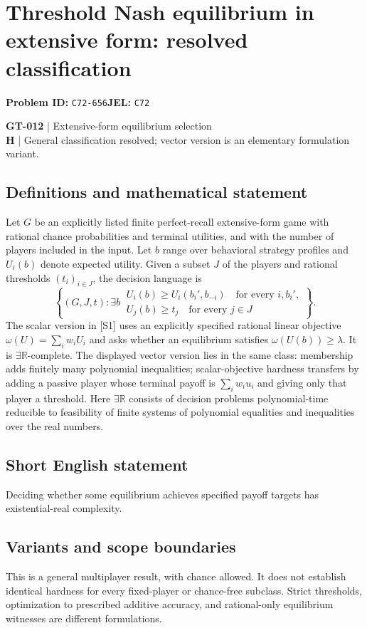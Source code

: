 \documentclass[11pt,a4paper]{article}
\begin{document}
\section*{Threshold Nash equilibrium in extensive form: resolved classification}
\textbf{Problem ID:} \texttt{C72-656}\quad \textbf{JEL:} \texttt{C72}\par
\label{problem:OP-0142}
\label{game:GT-012}
{\sffamily\small\color{muted}
\textbf{GT-012} | Extensive-form equilibrium selection\\
\textbf{H} | General classification resolved; vector version is an elementary formulation variant.
\par}
\subsection*{Definitions and mathematical statement}
Let $G$ be an explicitly listed finite perfect-recall extensive-form game with rational chance probabilities and terminal utilities, and with the number of players included in the input. Let $b$ range over behavioral strategy profiles and $U_i(b)$ denote expected utility. Given a subset $J$ of the players and rational thresholds $(t_i)_{i\in J}$, the decision language is
\[
 \left\{(G,J,t):\exists b\ 
 \begin{array}{l}
 U_i(b)\geq U_i(b_i',b_{-i})\quad\text{for every }i,b_i',\\
 U_j(b)\geq t_j\quad\text{for every }j\in J
 \end{array}\right\}.
\]
The scalar version in [S1] uses an explicitly specified rational linear objective $\omega(U)=\sum_iw_iU_i$ and asks whether an equilibrium satisfies $\omega(U(b))\geq\lambda$. It is $\exists\mathbb R$-complete. The displayed vector version lies in the same class: membership adds finitely many polynomial inequalities; scalar-objective hardness transfers by adding a passive player whose terminal payoff is $\sum_iw_iu_i$ and giving only that player a threshold.
Here $\exists\mathbb R$ consists of decision problems polynomial-time reducible to feasibility of finite systems of polynomial equalities and inequalities over the real numbers.
\subsection*{Short English statement}
Deciding whether some equilibrium achieves specified payoff targets has existential-real complexity.
\subsection*{Variants and scope boundaries}
This is a general multiplayer result, with chance allowed. It does not establish identical hardness for every fixed-player or chance-free subclass. Strict thresholds, optimization to prescribed additive accuracy, and rational-only equilibrium witnesses are different formulations.
\end{document}
